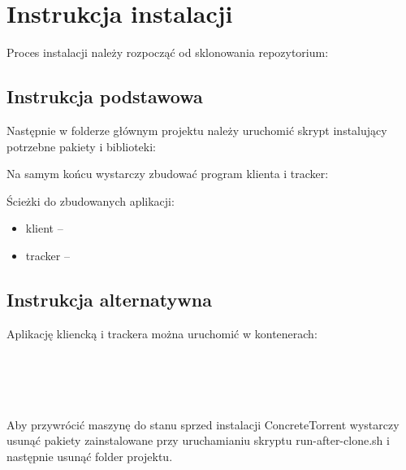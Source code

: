 \documentclass[11pt]{article}
\begin{document}
\section{Instrukcja instalacji}
Proces instalacji należy rozpocząć od sklonowania repozytorium:
	
\subsection{Instrukcja podstawowa} 	
Następnie w folderze głównym projektu należy uruchomić skrypt instalujący   potrzebne pakiety i biblioteki:	

	
Na samym końcu wystarczy zbudować program klienta i tracker:
	    	
	
		
Ścieżki do zbudowanych aplikacji:
	 
\begin{itemize}
\item klient -- 
\item tracker -- 
\end{itemize}
\subsection{Instrukcja alternatywna}	
Aplikację kliencką i trackera można uruchomić w kontenerach:
	
	\\	
	\\	
	\\ 	
	\\
		
	Aby przywrócić maszynę do stanu sprzed instalacji ConcreteTorrent  wystarczy usunąć pakiety zainstalowane przy uruchamianiu skryptu run-after-clone.sh i następnie usunąć folder projektu.
	
	
\end{document}

